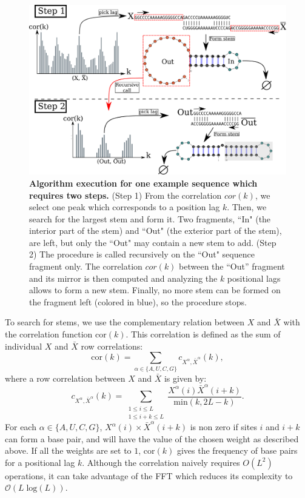 \begin{figure}[t!]
	\centering
	\includegraphics[width=.7\linewidth]{../res/images/rafft/algo_draw.png}
	\caption{\label{algo_desc}\textbf{Algorithm execution for one example sequence which requires two steps.} (Step 1) From the correlation $cor(k)$, we select one peak which corresponds to a position lag $k$. Then, we search for the largest stem and form it. Two fragments, ``In" (the interior part of the stem) and ``Out" (the exterior part of the stem), are left, but only the ``Out" may contain a new stem to add. (Step 2) The procedure is called recursively on the ``Out" sequence fragment only. The correlation $cor(k)$ between the ``Out'' fragment and its mirror is then computed and analyzing the $k$ positional lags allows to form a new stem. Finally, no more stem can be formed on the fragment left (colored in blue), so the procedure stops.}
\end{figure}


To search for stems, we use the complementary relation between \(X\) and \(\bar{X}\) with the correlation function \(\text{cor}(k)\). This correlation is defined as the sum of individual \(X\) and \(\bar{X}\) row correlations:
\begin{equation}
\text{cor}(k)=\sum_{\alpha \in \{A,U,C,G\}}c_{X^{\alpha},\bar{X}^{\alpha}}(k),
\end{equation}
where a row correlation between \(X\) and \(\bar{X}\) is given by:
\begin{equation}
c_{X^\alpha,\bar{X}^\alpha}(k) = \sum\limits_{\substack{1\leq i \leq L\\1 \leq i + k \leq L}} \frac{X^\alpha(i) \bar{X}^\alpha(i+k)}{\text{min}(k, 2 L-k)}.
\end{equation}
For each \(\alpha \in \{A,U,C,G\}\), \(X^\alpha(i) \times \bar{X}^\alpha(i+k)\) is non zero if sites \(i\) and \(i+k\) can form a base pair, and will have the value of the chosen weight as described above. If all the weights are set to $1$, \(\text{cor}(k)\) gives the frequency of base pairs for a positional lag \(k\). Although the correlation naively requires \(O(L^2)\) operations, it can take advantage of the FFT which reduces its complexity to \(\mathcal{O}(L\;\text{log}(L))\).

